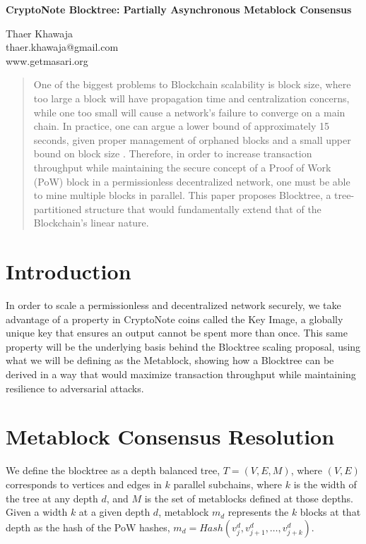\documentclass{article}
\begin{document}
\begin{center}
  \textbf{CryptoNote Blocktree: Partially Asynchronous Metablock Consensus}\\
  \vspace{5mm}

  {\small
    Thaer Khawaja\\
    thaer.khawaja@gmail.com\\
    www.getmasari.org\\
  }
  \vspace{5mm}
\end{center}

\begin{abstract}
One of the biggest problems to Blockchain scalability is block size, where too large a block will have propagation time and centralization concerns, while one too small will cause a network's failure to converge on a main chain. In practice, one can argue a lower bound of approximately 15 seconds, given proper management of orphaned blocks and a small upper bound on block size \cite{khawaja}. Therefore, in order to increase transaction throughput while maintaining the secure concept of a Proof of Work (PoW) block in a permissionless decentralized network, one must be able to mine multiple blocks in parallel. This paper proposes Blocktree, a tree-partitioned structure that would fundamentally extend that of the Blockchain's linear nature.
\end{abstract}

\section{Introduction}
In order to scale a permissionless and decentralized network securely, we take advantage of a property in CryptoNote coins called the Key Image, a globally unique key that ensures an output cannot be spent more than once\cite{saberhagen}. This same property will be the underlying basis behind the Blocktree scaling proposal, using what we will be defining as the Metablock, showing how a Blocktree can be derived in a way that would maximize transaction throughput while maintaining resilience to adversarial attacks.
\section{Metablock Consensus Resolution}
We define the blocktree as a depth balanced tree, $T = (V, E, M)$, where $(V,E)$ corresponds to vertices and edges in $k$ parallel subchains, where $k$ is the width of the tree at any depth $d$, and $M$ is the set of metablocks defined at those depths. Given a width $k$ at a given depth $d$, metablock $m_d$ represents the $k$ blocks at that depth as the hash of the PoW hashes, $m_d = Hash(v_j^d,v_{j + 1}^d,\ldots,v_{j+k}^d)$.
\end{document}
